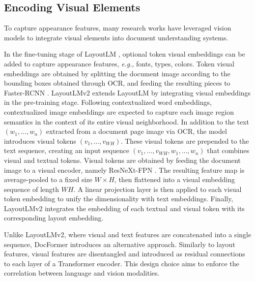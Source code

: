 \subsection{Encoding Visual Elements} 

To capture appearance features, many research works have leveraged vision models to integrate visual elements into document understanding systems.


In the fine-tuning stage of LayoutLM \citep{xu2020layoutlm}, optional token visual embeddings can be added to capture appearance features, \textit{e.g.}, fonts, types, colors. Token visual embeddings are obtained by splitting the document image according to the bounding boxes obtained through \ac{OCR}, and feeding the resulting pieces to Faster-RCNN \citep{ren2015faster}. LayoutLMv2 \citep{xu2020layoutlmv2} extends LayoutLM by integrating visual embeddings in the pre-training stage. Following contextualized word embeddings, contextualized image embeddings are expected to capture each image region semantics in the context of its entire visual neighborhood. In addition to the text $(w_1, \ldots, w_n)$ extracted from a document page image via \ac{OCR}, the model introduces visual tokens $(v_1, \ldots, v_{WH})$. These visual tokens are prepended to the text sequence, creating an input sequence $(v_1, \ldots, v_{WH}, w_1, \ldots, w_n)$ that combines visual and textual tokens. Visual tokens are obtained by feeding the document image to a visual encoder, namely ResNeXt-FPN \citep{xie2017aggregated, lin2017feature}. The resulting feature map is average-pooled to a fixed size $W \times H$, then flattened into a visual embedding sequence of length $WH$. A linear projection layer is then applied to each visual token embedding to unify the dimensionality with text embeddings. Finally, LayoutLMv2 integrates the embedding of
each textual and visual token with its corresponding layout embedding. 

Unlike LayoutLMv2, where visual and text features are concatenated into a single sequence, DocFormer introduces an alternative approach. Similarly to layout features, visual features are disentangled and introduced as residual connections to each layer of a Transformer encoder. This design choice aims to enforce the correlation between language and vision modalities. 

